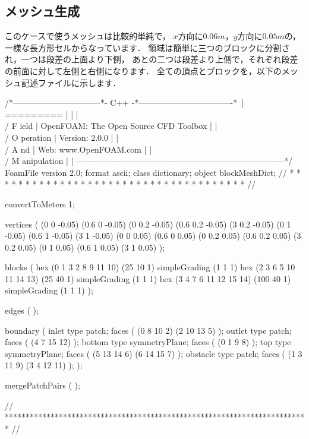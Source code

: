 \subsection{メッシュ生成}
\label{ssec:3.3.2}
このケースで使うメッシュは比較的単純で，
$x$方向に$0.06 \unit{m}$，$y$方向に$0.05 \unit{m}$の，
一様な長方形セルからなっています．
領域は簡単に三つのブロックに分割され，一つは段差の上面より下側，
あとの二つは段差より上側で，それぞれ段差の前面に対して左側と右側になります．
全ての頂点とブロックを，以下のメッシュ記述ファイルに示します．
\begin{OFverbatim}
/*--------------------------------*- C++ -*----------------------------------*\
| =========                 |                                                 |
| \\      /  F ield         | OpenFOAM: The Open Source CFD Toolbox           |
|  \\    /   O peration     | Version:  2.0.0                                 |
|   \\  /    A nd           | Web:      www.OpenFOAM.com                      |
|    \\/     M anipulation  |                                                 |
\*---------------------------------------------------------------------------*/
FoamFile
{
    version     2.0;
    format      ascii;
    class       dictionary;
    object      blockMeshDict;
}
// * * * * * * * * * * * * * * * * * * * * * * * * * * * * * * * * * * * * * //

convertToMeters 1;

vertices        
(
    (0 0 -0.05)
    (0.6 0 -0.05)
    (0 0.2 -0.05)
    (0.6 0.2 -0.05)
    (3 0.2 -0.05)
    (0 1 -0.05)
    (0.6 1 -0.05)
    (3 1 -0.05)
    (0 0 0.05)
    (0.6 0 0.05)
    (0 0.2 0.05)
    (0.6 0.2 0.05)
    (3 0.2 0.05)
    (0 1 0.05)
    (0.6 1 0.05)
    (3 1 0.05)
);

blocks          
(
    hex (0 1 3 2 8 9 11 10) (25 10 1) simpleGrading (1 1 1)
    hex (2 3 6 5 10 11 14 13) (25 40 1) simpleGrading (1 1 1)
    hex (3 4 7 6 11 12 15 14) (100 40 1) simpleGrading (1 1 1)
);

edges           
(
);

boundary
(
    inlet
    {
        type patch;
        faces
        (
            (0 8 10 2)
            (2 10 13 5)
        );
    }
    outlet
    {
        type patch;
        faces
        (
            (4 7 15 12)
        );
    }
    bottom
    {
        type symmetryPlane;
        faces
        (
            (0 1 9 8)
        );
    }
    top
    {
        type symmetryPlane;
        faces
        (
            (5 13 14 6)
            (6 14 15 7)
        );
    }
    obstacle
    {
        type patch;
        faces
        (
            (1 3 11 9)
            (3 4 12 11)
        );
    }
);

mergePatchPairs
(
);

// ************************************************************************* //
\end{OFverbatim}


